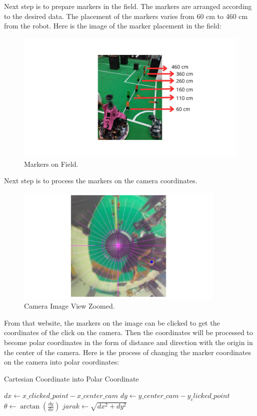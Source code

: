 Next step is to prepare markers in the field. The markers are arranged according to the desired data. The placement of the markers varies from 60 cm to 460 cm from the robot. Here is the image of the marker placement in the field:

\begin{figure}[H]
  \centering
  \includegraphics[width=12cm]{gambar/ambil_data_new.jpg}
  \caption{Markers on Field.}
  \label{fig:diag311}
\end{figure}

Next step is to process the markers on the camera coordinates. 

\begin{figure}[H]
  \centering
  \includegraphics[width=10cm]{gambar/web_zoom.jpg}
  \caption{Camera Image View Zoomed.}
  \label{fig:diag312}
\end{figure}

From that website, the markers on the image can be clicked to get the coordinates of the click on the camera. Then the coordinates will be processed to become polar coordinates in the form of distance and direction with the origin in the center of the camera. Here is the process of changing the marker coordinates on the camera into polar coordinates:

\begin{algorithm}[H]
  \caption{Cartesian Coordinate into Polar Coordinate}\label{alg:prosedur2}
  \begin{algorithmic}[1]
      \State $dx \gets x\_clicked\_point - x\_center\_cam$
      \State $dy \gets y\_center\_cam - y_clicked\_point$
      \State $\theta \gets \arctan(\frac{dy}{dx})$
      \State $jarak \gets \sqrt{dx^2 + dy^2}$
  \EndProcedure
  \end{algorithmic}
\end{algorithm}

